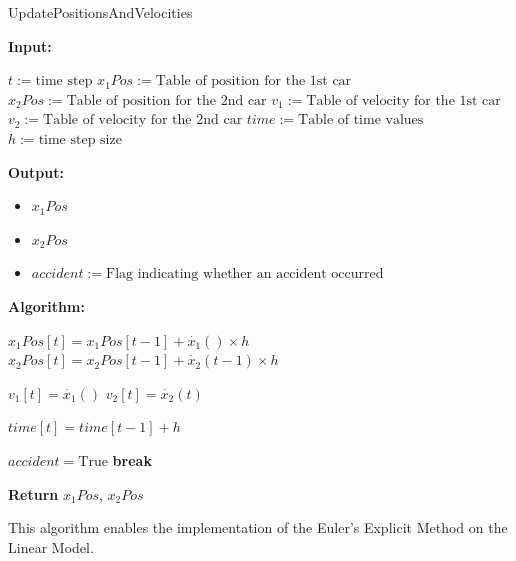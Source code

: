 \documentclass{article}
\begin{document}
			
			
			\begin{algorithm}[H]
				\caption{UpdatePositionsAndVelocities}\label{alg:update_positions}
				\begin{algorithmic}
					\State \textbf{Input:} \\
					\begin{itemize}
						\State $t:=\text{time step}$
						\State $x_1Pos:=\text{Table of position for the 1st car}$
						\State $x_2Pos:=\text{Table of position for the 2nd car}$
						\State $v_1:=\text{Table of velocity for the 1st car}$
						\State $v_2:=\text{Table of velocity for the 2nd car}$
						\State $time:=\text{Table of time values}$
						\State $h:=\text{time step size}$
					\end{itemize}
					\State \textbf{Output:} \\
					\begin{itemize}
						\item $x_1Pos$ 
						\item $x_2Pos$
					\end{itemize}
					\begin{itemize}[]
						\item $accident:=\text{Flag indicating whether an accident occurred}$
					\end{itemize}
					\State \textbf{Algorithm:} \\
					\begin{itemize}[]
						\State $x_1Pos[t] = x_1Pos[t-1] + \dot{x_1}() \times h$
						\State $x_2Pos[t] = x_2Pos[t-1] + \dot{x_2}(t-1) \times h$
						
						\State $v_1[t] = \dot{x_1}()$
						\State $v_2[t] = \dot{x_2}(t)$
						
						\State $time[t] = time[t-1] + h$
						
						\State $accident = \text{True}$
						\State \textbf{break}
						\EndIf
						\EndFor
					\end{itemize}
					\State \textbf{Return} $x_1Pos$, $x_2Pos$
				\end{algorithmic}
			\end{algorithm}
			This algorithm enables the implementation of the Euler's Explicit Method on the Linear Model.
			
		\newpage
\end{document}

